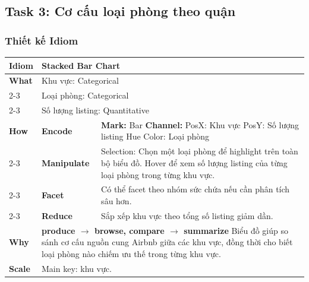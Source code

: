 \subsection{Task 3: Cơ cấu loại phòng theo quận}

\subsubsection{Thiết kế Idiom}

\begin{table}[H]
\centering
\renewcommand{\arraystretch}{1.1}
\begin{tabularx}{\textwidth}{|l|l|X|}
\hline
\textbf{Idiom} & \multicolumn{2}{l|}{\textbf{Stacked Bar Chart}} \\ \hline
\textbf{What}
& \multicolumn{2}{X|}{Khu vực: Categorical} \\ \cline{2-3}
& \multicolumn{2}{X|}{Loại phòng: Categorical} \\ \cline{2-3}
& \multicolumn{2}{X|}{Số lượng listing: Quantitative} \\ \hline
\textbf{How}
& \textbf{Encode} &
\textbf{Mark:} Bar \newline
\textbf{Channel:} \newline
\hspace*{1em} PosX: Khu vực \newline
\hspace*{1em} PosY: Số lượng listing \newline
\hspace*{1em} Hue Color: Loại phòng \\ \cline{2-3}
& \textbf{Manipulate} &
Selection: Chọn một loại phòng để highlight trên toàn bộ biểu đồ. \newline
Hover để xem số lượng listing của từng loại phòng trong từng khu vực. \\ \cline{2-3}
& \textbf{Facet} &
Có thể facet theo nhóm sức chứa nếu cần phân tích sâu hơn. \\ \cline{2-3}
& \textbf{Reduce} &
Sắp xếp khu vực theo tổng số listing giảm dần. \\ \hline
\textbf{Why} & \multicolumn{2}{X|}{
\textbf{produce $\rightarrow$ browse, compare $\rightarrow$ summarize} \newline
Biểu đồ giúp so sánh cơ cấu nguồn cung Airbnb giữa các khu vực, đồng thời cho biết loại phòng nào chiếm ưu thế trong từng khu vực.
} \\ \hline
\textbf{Scale} & \multicolumn{2}{X|}{
Main key: khu vực.
} \\ \hline
\end{tabularx}
\end{table}

